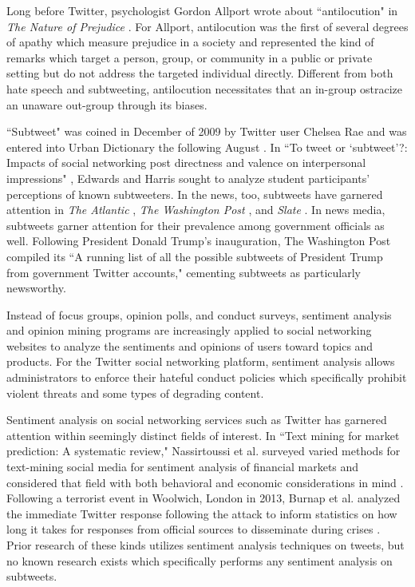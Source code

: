 \documentclass[11pt, twoside, reqno]{book}
\begin{document}
Long before Twitter, psychologist Gordon Allport wrote about ``antilocution" in \textit{The Nature of Prejudice} \cite{antilocution}. For Allport, antilocution was the first of several degrees of apathy which measure prejudice in a society and represented the kind of remarks which target a person, group, or community in a public or private setting but do not address the targeted individual directly. Different from both hate speech and subtweeting, antilocution necessitates that an in-group ostracize an unaware out-group through its biases. 

``Subtweet" was coined in December of 2009 by Twitter user Chelsea Rae \cite{first_subtweet} and was entered into Urban Dictionary the following August \cite{urban_dictionary}. In ``To tweet or ‘subtweet’?: Impacts of social networking post directness and valence on interpersonal impressions" \cite{subtweets_communications}, Edwards and Harris sought to analyze student participants' perceptions of known subtweeters. In the news, too, subtweets have garnered attention in \textit{The Atlantic} \cite{the_atlantic}, \textit{The Washington Post} \cite{the_washington_post}, and \textit{Slate} \cite{slate}. In news media, subtweets garner attention for their prevalence among government officials as well. Following President Donald Trump's inauguration, The Washington Post compiled its ``A running list of all the possible subtweets of President Trump from government Twitter accounts," \cite{the_washington_post_trump} cementing subtweets as particularly newsworthy.

Instead of focus groups, opinion polls, and conduct surveys, sentiment analysis and opinion mining programs are increasingly applied to social networking websites to analyze the sentiments and opinions of users toward topics and products. For the Twitter social networking platform, sentiment analysis allows administrators to enforce their hateful conduct policies \cite{hateful_conduct} which specifically prohibit violent threats and some types of degrading content. 

Sentiment analysis on social networking services such as Twitter has garnered attention within seemingly distinct fields of interest. In ``Text mining for market prediction: A systematic review," Nassirtoussi et al. surveyed varied methods for text-mining social media for sentiment analysis of financial markets and considered that field with both behavioral and economic considerations in mind \cite{sentiment_analysis_markets}. Following a terrorist event in Woolwich, London in 2013, Burnap et al. analyzed the immediate Twitter response following the attack to inform statistics on how long it takes for responses from official sources to disseminate during crises \cite{sentiment_analysis_terrorism}. Prior research of these kinds utilizes sentiment analysis techniques on tweets, but no known research exists which specifically performs any sentiment analysis on subtweets. 
\end{document}
